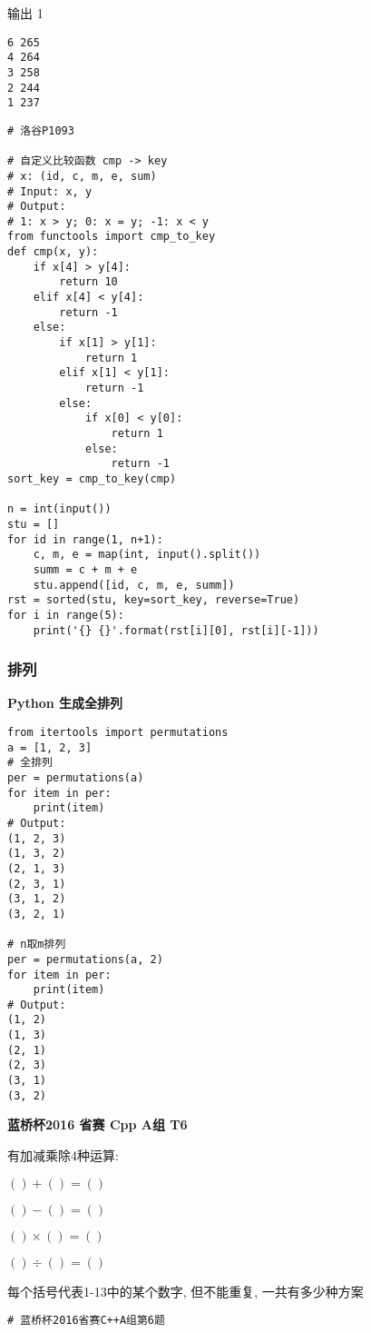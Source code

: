 \documentclass[../main]{subfiles}
\begin{document}
\begin{sloppy}
输出 1

\begin{verbatim}
6 265
4 264
3 258
2 244
1 237
\end{verbatim}

\begin{lstlisting}[style = Python]
# 洛谷P1093

# 自定义比较函数 cmp -> key
# x: (id, c, m, e, sum)
# Input: x, y
# Output:
# 1: x > y; 0: x = y; -1: x < y
from functools import cmp_to_key
def cmp(x, y):
    if x[4] > y[4]:
        return 10
    elif x[4] < y[4]:
        return -1
    else:
        if x[1] > y[1]:
            return 1
        elif x[1] < y[1]:
            return -1
        else:
            if x[0] < y[0]:
                return 1
            else:
                return -1
sort_key = cmp_to_key(cmp)

n = int(input())
stu = []
for id in range(1, n+1):
    c, m, e = map(int, input().split())
    summ = c + m + e
    stu.append([id, c, m, e, summ])
rst = sorted(stu, key=sort_key, reverse=True)
for i in range(5):
    print('{} {}'.format(rst[i][0], rst[i][-1]))
\end{lstlisting}

\newpage
\subsubsection{排列}

\textbf{Python 生成全排列}

\begin{lstlisting}[style = Python]
from itertools import permutations
a = [1, 2, 3]
# 全排列
per = permutations(a)
for item in per:
    print(item)
# Output:
(1, 2, 3)
(1, 3, 2)
(2, 1, 3)
(2, 3, 1)
(3, 1, 2)
(3, 2, 1)

# n取m排列
per = permutations(a, 2)
for item in per:
    print(item)
# Output:
(1, 2)
(1, 3)
(2, 1)
(2, 3)
(3, 1)
(3, 2)
\end{lstlisting}

\newpage
\textbf{蓝桥杯2016 省赛 Cpp A组 T6}

有加减乘除4种运算:

$() + () = ()$

$() - () = ()$

$() \times () = ()$

$() \div () = ()$

每个括号代表1-13中的某个数字, 但不能重复, 一共有多少种方案

\begin{lstlisting}[style = Python]
# 蓝桥杯2016省赛C++A组第6题


\end{lstlisting}
\end{sloppy}
\end{document}
